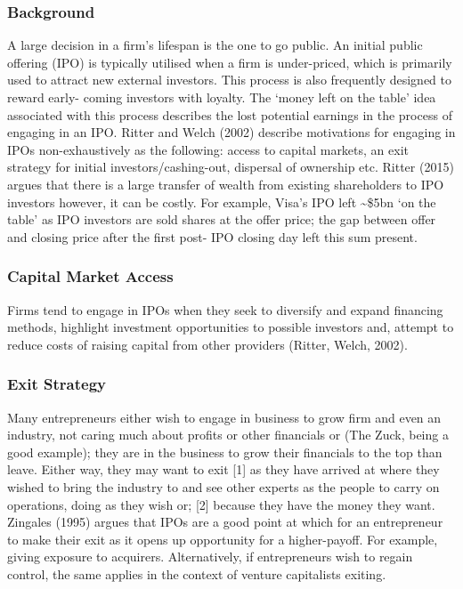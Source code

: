 \documentclass[11pt, english]{article}
\begin{document}
		\subsubsection*{Background}

	A large decision in a firm’s lifespan is the one to go public. An initial public offering (IPO) is typically utilised when a firm is under-priced, which is primarily used to attract new external investors. This process is also frequently designed to reward early- coming investors with loyalty. The ‘money left on the table’ idea associated with this process describes the lost potential earnings in the process of engaging in an IPO. Ritter and Welch (2002) describe motivations for engaging in IPOs non-exhaustively as the following: access to capital markets, an exit strategy for initial investors/cashing-out, dispersal of ownership etc. Ritter (2015) argues that there is a large transfer of wealth from existing shareholders to IPO investors however, it can be costly. For example, Visa’s IPO left \~{}\$5bn ‘on the table’ as IPO investors are sold shares at the offer price; the gap between offer and closing price after the first post- IPO closing day left this sum present.

		\subsubsection*{Capital Market Access}

	Firms tend to engage in IPOs when they seek to diversify and expand financing methods, highlight investment opportunities to possible investors and, attempt to reduce costs of raising capital from other providers (Ritter, Welch, 2002).

		\subsubsection*{Exit Strategy}

	Many entrepreneurs either wish to engage in business to grow firm and even an industry, not caring much about profits or other financials or (The Zuck, being a good example); they are in the business to grow their financials to the top than leave. Either way, they may want to exit [1] as they have arrived at where they wished to bring the industry to and see other experts as the people to carry on operations, doing as they wish or; [2] because they have the money they want. Zingales (1995) argues that IPOs are a good point at which for an entrepreneur to make their exit as it opens up opportunity for a higher-payoff. For example, giving exposure to acquirers. Alternatively, if entrepreneurs wish to regain control, the same applies in the context of venture capitalists exiting.
\end{document}
